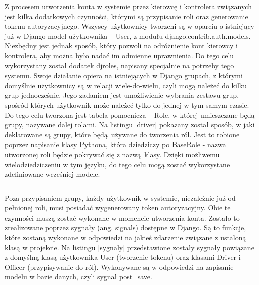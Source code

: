 Z procesem utworzenia konta w systemie przez kierowcę i kontrolera związanych jest kilka dodatkowych czynności, którymi są przypisanie roli oraz generowanie tokenu autoryzacyjnego. Wszyscy użytkownicy tworzeni są w oparciu o istniejący już w Django model użytkownika -- User, z modułu django.contrib.auth.models. Niezbędny jest jednak sposób, który pozwoli na odróżnienie kont kierowcy i kontrolera, aby można było nadać im odmienne uprawnienia. Do tego celu wykorzystany został dodatek djroles, napisany specjalnie na potrzeby tego systemu. Swoje działanie opiera na istniejących w Django grupach, z którymi domyślnie użytkownicy są w relacji wiele-do-wielu, czyli mogą należeć do kilku grup jednocześnie. Jego zadaniem jest umożliwienie wybrania zestawu grup, spośród których użytkownik może należeć tylko do jednej w tym samym czasie. Do tego celu tworzona jest tabela pomocnicza -- Role, w której umieszczane będą grupy, nazywane dalej rolami. Na listingu \ref{driver} pokazany został sposób, w jaki deklarowane są grupy, które będą używane do tworzenia ról. Jest to robione poprzez napisanie klasy Pythona, która dziedziczy po BaseRole - nazwa utworzonej roli będzie pokrywać się z nazwą klasy. Dzięki możliwemu wielodziedziczeniu w tym języku, do tego celu mogą zostać wykorzystane zdefiniowane wcześniej modele.

\begin{singlespace}
	\label{driver}
	\vspace{0.3cm}
	\inputminted[fontsize=\footnotesize, linenos=true]{python}{src/imp/driver.py}
\end{singlespace}

\vspace{0.3cm}

Poza przypisaniem grupy, każdy użytkownik w systemie, niezależnie już od pełnionej roli, musi posiadać wygenerowany token autoryzacyjny. Obie te czynności muszą zostać wykonane w momencie utworzenia konta. Zostało to zrealizowane poprzez sygnały (ang. signals) dostępne w Django. Są to funkcje, które zostaną wykonane w odpowiedzi na jakieś zdarzenie związane z ustaloną klasą w projekcie. Na listingu \ref{sygnaly} przedstawione zostały sygnały powiązane z domyślną klasą użytkownika User (tworzenie tokenu) oraz klasami Driver i Officer (przypisywanie do ról). Wykonywane są w odpowiedzi na zapisanie modelu w bazie danych, czyli sygnał post\_save.

\begin{singlespace}
	\label{sygnaly}
	\vspace{0.3cm}
	\inputminted[fontsize=\footnotesize, linenos=true]{python}{src/imp/token_signal.py}
\end{singlespace}

